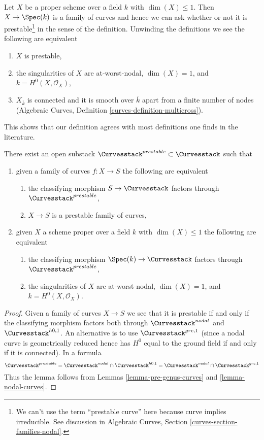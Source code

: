 \noindent
Let $X$ be a proper scheme over a field $k$ with $\dim(X) \leq 1$.
Then $X \to \Spec(k)$ is a family of curves and hence we can ask
whether or not it is prestable\footnote{We can't use the term
``prestable curve'' here because curve implies irreducible. See
discussion in Algebraic Curves, Section \ref{curves-section-families-nodal}.}
in the sense of the definition. Unwinding the definitions we see
the following are equivalent
\begin{enumerate}
\item $X$ is prestable,
\item the singularities of $X$ are at-worst-nodal, $\dim(X) = 1$,
and $k = H^0(X, \mathcal{O}_X)$,
\item $X_{\overline{k}}$ is connected and it is smooth over $\overline{k}$
apart from a finite number of nodes
(Algebraic Curves, Definition \ref{curves-definition-multicross}).
\end{enumerate}
This shows that our definition agrees with most definitions one finds
in the literature.

\begin{lemma}
\label{lemma-prestable-curves}
There exist an open substack $\Curvesstack^{prestable} \subset \Curvesstack$
such that
\begin{enumerate}
\item given a family of curves $f : X \to S$ the following are equivalent
\begin{enumerate}
\item the classifying morphism $S \to \Curvesstack$ factors
through $\Curvesstack^{prestable}$,
\item $X \to S$ is a prestable family of curves,
\end{enumerate}
\item given $X$ a scheme proper over a field $k$ with
$\dim(X) \leq 1$ the following are equivalent
\begin{enumerate}
\item the classifying morphism $\Spec(k) \to \Curvesstack$
factors through $\Curvesstack^{prestable}$,
\item the singularities of $X$ are at-worst-nodal, $\dim(X) = 1$,
and $k = H^0(X, \mathcal{O}_X)$.
\end{enumerate}
\end{enumerate}
\end{lemma}

\begin{proof}
Given a family of curves $X \to S$ we see that it is prestable if
and only if the classifying morphism factors both through
$\Curvesstack^{nodal}$ and $\Curvesstack^{h0, 1}$. An alternative
is to use $\Curvesstack^{grc, 1}$ (since a nodal curve is geometrically
reduced hence has $H^0$ equal to the ground field if and only if
it is connected). In a formula
$$
\Curvesstack^{prestable} =
\Curvesstack^{nodal} \cap \Curvesstack^{h0, 1} =
\Curvesstack^{nodal} \cap \Curvesstack^{grc, 1}
$$
Thus the lemma follows from
Lemmas \ref{lemma-pre-genus-curves} and \ref{lemma-nodal-curves}.
\end{proof}

